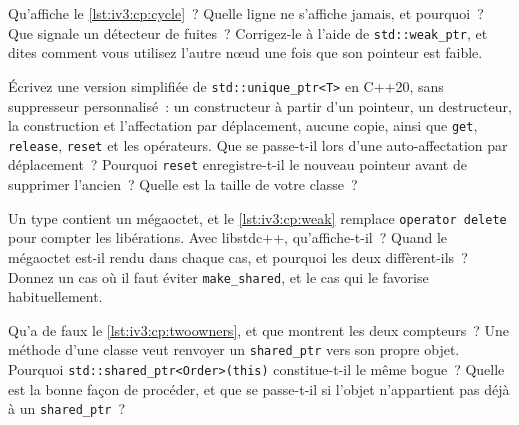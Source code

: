 \begin{question}\label{iq:iv3:cpp:22}
Qu'affiche le \cref{lst:iv3:cp:cycle}~? Quelle ligne ne s'affiche jamais, et pourquoi~? Que signale un détecteur de fuites~? Corrigez-le à l'aide de \texttt{std::weak\_ptr}, et dites comment vous utilisez l'autre nœud une fois que son pointeur est faible.
\label{lst:iv3:cp:cycle}
\end{question}

\begin{question}\label{iq:iv3:cpp:23}
Écrivez une version simplifiée de \texttt{std::unique\_ptr<T>} en C++20, sans suppresseur personnalisé~: un constructeur à partir d'un pointeur, un destructeur, la construction et l'affectation par déplacement, aucune copie, ainsi que \texttt{get}, \texttt{release}, \texttt{reset} et les opérateurs. Que se passe-t-il lors d'une auto-affectation par déplacement~? Pourquoi \texttt{reset} enregistre-t-il le nouveau pointeur avant de supprimer l'ancien~? Quelle est la taille de votre classe~?
\end{question}

\begin{question}\label{iq:iv3:cpp:24}
Un type contient un mégaoctet, et le \cref{lst:iv3:cp:weak} remplace \texttt{operator delete} pour compter les libérations. Avec libstdc++, qu'affiche-t-il~? Quand le mégaoctet est-il rendu dans chaque cas, et pourquoi les deux diffèrent-ils~? Donnez un cas où il faut éviter \texttt{make\_shared}, et le cas qui le favorise habituellement.
\label{lst:iv3:cp:weak}
\end{question}

\begin{question}\label{iq:iv3:cpp:25}
Qu'a de faux le \cref{lst:iv3:cp:twoowners}, et que montrent les deux compteurs~? Une méthode d'une classe veut renvoyer un \texttt{shared\_ptr} vers son propre objet. Pourquoi \texttt{std::shared\_ptr<Order>(this)} constitue-t-il le même bogue~? Quelle est la bonne façon de procéder, et que se passe-t-il si l'objet n'appartient pas déjà à un \texttt{shared\_ptr}~?
\label{lst:iv3:cp:twoowners}
\end{question}

